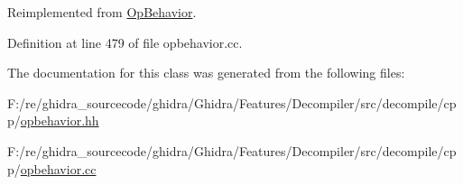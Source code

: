 Reimplemented from \mbox{\hyperlink{class_op_behavior_aeeed3af7aa35264b31a1f182884214a9}{Op\+Behavior}}.



Definition at line 479 of file opbehavior.\+cc.



The documentation for this class was generated from the following files\+:\begin{DoxyCompactItemize}
\item 
F\+:/re/ghidra\+\_\+sourcecode/ghidra/\+Ghidra/\+Features/\+Decompiler/src/decompile/cpp/\mbox{\hyperlink{opbehavior_8hh}{opbehavior.\+hh}}\item 
F\+:/re/ghidra\+\_\+sourcecode/ghidra/\+Ghidra/\+Features/\+Decompiler/src/decompile/cpp/\mbox{\hyperlink{opbehavior_8cc}{opbehavior.\+cc}}\end{DoxyCompactItemize}

